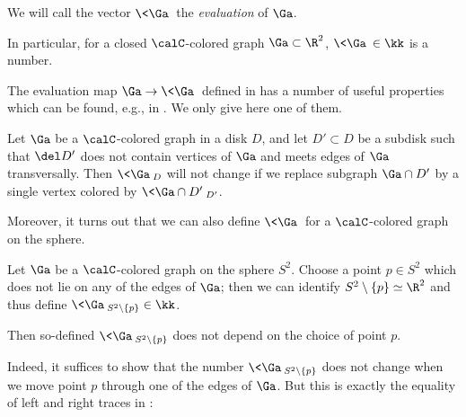 \begin{theorem}
%
%
We will call the vector $\<\Ga\>$ the {\em evaluation} of $\Ga$.
\end{theorem}

In particular, for a closed $\calC$-colored graph $\Ga\subset \R^2$,
$\<\Ga\>\in \kk$ is a number.

The evaluation map $\Ga\to\<\Ga\>$ defined in  has a
number of useful properties which can be found, e.g., in
\cite{kirillov-stringnet}. We only give here one of them.

\begin{lemma}\label{l:eval-subdisk}
  Let $\Ga$ be a $\calC$-colored graph in a disk $D$, and let $D'\subset D$ be
  a subdisk such that $\del D'$ does not contain vertices of $\Ga$ and meets
  edges of $\Ga$ transversally. Then $\<\Ga\>_D$ will not change if we replace
  subgraph $\Ga\cap D'$ by a single vertex colored by $\<\Ga\cap D'\>_{D'}$.
\end{lemma}

Moreover, it turns out that we can also define $\<\Ga\>$ for a $\calC$-colored
graph on the sphere.

\begin{lemma}\label{l:colored-spherical}
  Let $\Ga$ be a $\calC$-colored graph on the sphere $S^2$. Choose a point $p\in
  S^2$ which does not lie on any of the edges of $\Ga$; then we can
  identify $S^2\setminus\{p\}\simeq \R^2$ and thus define
  $\<\Ga\>_{S^2\setminus\{p\}}\in \kk$.

  Then so-defined $\<\Ga\>_{S^2\setminus\{p\}}$ does not depend on the choice
  of point
  $p$.
\end{lemma}
Indeed, it suffices to show that the number $\<\Ga\>_{S^2\setminus\{p\}}$ does
not
change when we move point $p$ through one of the edges of $\Ga$. But this is
exactly the equality of left and right traces in :

